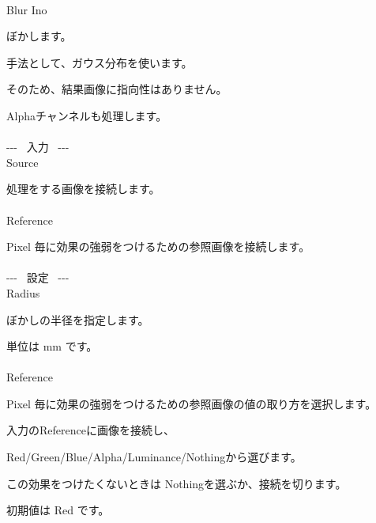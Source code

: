 \documentclass[a4paper,12pt]{article}
\begin{document}
\thispagestyle{empty}

\Large
\noindent \\
Blur Ino\medskip
\par
\normalsize
ぼかします。\\
\par
手法として、ガウス分布を使います。\par
そのため、結果画像に指向性はありません。\\
\par
Alphaチャンネルも処理します。\\
\\
-{-}- \ 入力 \ -{-}-\\
Source\par
処理をする画像を接続します。\\
\\
Reference\par
Pixel 毎に効果の強弱をつけるための参照画像を接続します。\\
\\
-{-}- \ 設定 \ -{-}-\\
Radius\par
ぼかしの半径を指定します。\par
単位は mm です。\\
\\
Reference\par
Pixel 毎に効果の強弱をつけるための参照画像の値の取り方を選択します。\par
入力の\textquotedbl Reference\textquotedbl に画像を接続し、\par
Red/Green/Blue/Alpha/Luminance/Nothingから選びます。\par
この効果をつけたくないときは Nothingを選ぶか、接続を切ります。\par
初期値は Red です。
\end{document}
